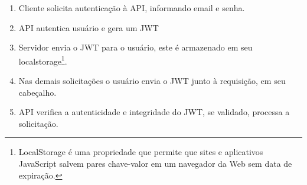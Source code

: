 \begin{itemize}
    \begin{enumerate}
        \item Cliente solicita autenticação à API, informando email e senha.
        \item API autentica usuário e gera um JWT 
        \item Servidor envia o JWT para o usuário, este é armazenado em seu localstorage\footnote{ LocalStorage é uma propriedade que permite que sites e aplicativos JavaScript salvem pares chave-valor em um navegador da Web sem data de expiração.}.
        \item Nas demais solicitações o usuário envia o JWT junto à requisição, em seu cabeçalho.
        \item API verifica a autenticidade e integridade do JWT, se validado, processa a solicitação.
    \end{enumerate}
\end{itemize}
\newpage

